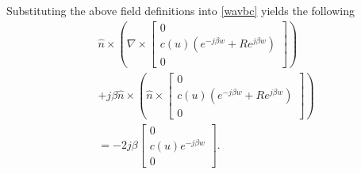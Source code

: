 Substituting the above field definitions into \ref*{wavbc} yields the following
\begin{multline}
    \hat{n} \times \left(\nabla \times \begin{bmatrix}
        0 \\
        c(u)(e^{-j\beta w}+Re^{j\beta w})\\
        0
    \end{bmatrix}\right) \\ +j\beta\hat{n}\times\left(\hat{n} \times \begin{bmatrix}
        0 \\
        c(u)(e^{-j\beta w}+Re^{j\beta w})\\
        0
    \end{bmatrix}\right) \\ =-2j\beta\begin{bmatrix}
        0 \\
        c(u)e^{-j\beta w}\\
        0
    \end{bmatrix}.
    \label{wavbcvec}
\end{multline}

